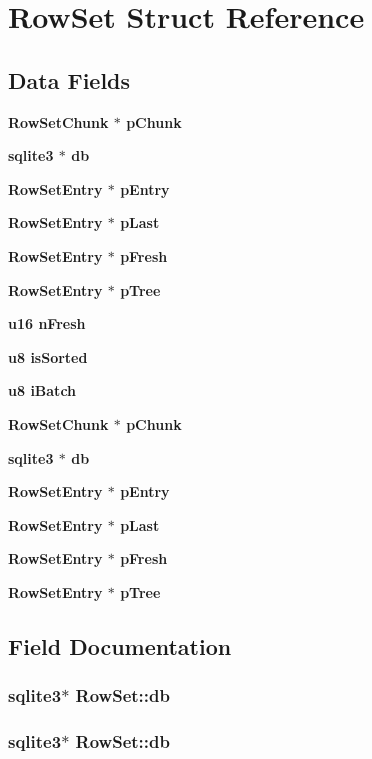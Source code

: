 \section{Row\-Set Struct Reference}
\label{structRowSet}
\subsection*{Data Fields}
\begin{CompactItemize}
\item 
\bf{Row\-Set\-Chunk} $\ast$ \bf{p\-Chunk}
\item 
\bf{sqlite3} $\ast$ \bf{db}
\item 
\bf{Row\-Set\-Entry} $\ast$ \bf{p\-Entry}
\item 
\bf{Row\-Set\-Entry} $\ast$ \bf{p\-Last}
\item 
\bf{Row\-Set\-Entry} $\ast$ \bf{p\-Fresh}
\item 
\bf{Row\-Set\-Entry} $\ast$ \bf{p\-Tree}
\item 
\bf{u16} \bf{n\-Fresh}
\item 
\bf{u8} \bf{is\-Sorted}
\item 
\bf{u8} \bf{i\-Batch}
\item 
\bf{Row\-Set\-Chunk} $\ast$ \bf{p\-Chunk}
\item 
\bf{sqlite3} $\ast$ \bf{db}
\item 
\bf{Row\-Set\-Entry} $\ast$ \bf{p\-Entry}
\item 
\bf{Row\-Set\-Entry} $\ast$ \bf{p\-Last}
\item 
\bf{Row\-Set\-Entry} $\ast$ \bf{p\-Fresh}
\item 
\bf{Row\-Set\-Entry} $\ast$ \bf{p\-Tree}
\end{CompactItemize}


\subsection{Field Documentation}
\subsubsection{\setlength{\rightskip}{0pt plus 5cm}\bf{sqlite3}$\ast$ \bf{Row\-Set::db}}\label{structRowSet_9d720d436930bcde7ccce58739a2c6e3}


\subsubsection{\setlength{\rightskip}{0pt plus 5cm}\bf{sqlite3}$\ast$ \bf{Row\-Set::db}}\label{structRowSet_9d720d436930bcde7ccce58739a2c6e3}


